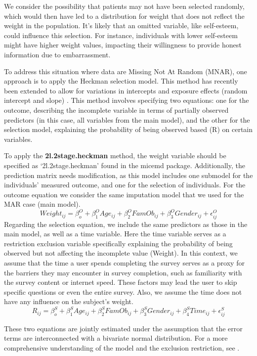 \documentclass[
  article]{jss}
\begin{document}
We consider the possibility that patients may not have been selected
randomly, which would then have led to a distribution for weight that
does not reflect the weight in the population. It's likely that an
omitted variable, like self-esteem, could influence this selection. For
instance, individuals with lower self-esteem might have higher weight
values, impacting their willingness to provide honest information due to
embarrassment.

To address this situation where data are Missing Not At Random (MNAR),
one approach is to apply the Heckman selection model. This method has
recently been extended to allow for variations in intercepts and
exposure effects (random intercept and slope)
\cite{galimard2018, munoz2023}. This method involves specifying two
equations: one for the outcome, describing the incomplete variable in
terms of partially observed predictors (in this case, all variables from
the main model), and the other for the selection model, explaining the
probability of being observed based (R) on certain variables.

To apply the \textbf{2l.2stage.heckman} method, the weight variable
should be specified as `2l.2stage.heckman' found in the micemd package.
Additionally, the prediction matrix needs modification, as this model
includes one submodel for the individuals' measured outcome, and one for
the selection of individuals. For the outcome equation we consider the
same imputation model that we used for the MAR case (main model).
\[Weight_{ij}= \beta^O_{o} + \beta^O_{1}Age_{ij} + \beta^O_{2}FamOb_{ij}+ \beta^O_{3}Gender_{ij} + \epsilon^O_{ij}\]
Regarding the selection equation, we include the same predictors as
those in the main model, as well as a time variable. Here the time
variable serves as a restriction exclusion variable specifically
explaining the probability of being observed but not affecting the
incomplete value (Weight). In this context, we assume that the time a
user spends completing the survey serves as a proxy for the barriers
they may encounter in survey completion, such as familiarity with the
survey content or internet speed. These factors may lead the user to
skip specific questions or even the entire survey. Also, we assume the
time does not have any influence on the subject's weight.
\[R_{ij}= \beta^S_{o} + \beta^S_{1}Age_{ij} + \beta^S_{2}FamOb_{ij}+ \beta^S_{3}Gender_{ij} +\beta^S_{4}Time_{ij}+ \epsilon^S_{ij}\]

These two equations are jointly estimated under the assumption that the
error terms are interconnected with a bivariate normal distribution. For
a more comprehensive understanding of the model and the exclusion
restriction, see \cite{munoz2023}.
\end{document}
